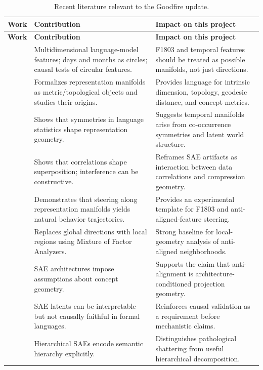 \documentclass[11pt,a4paper]{article}
\begin{document}
\begin{longtable}{@{}p{3.2cm}p{5.2cm}p{6.2cm}@{}}
\caption{Recent literature relevant to the Goodfire update.}\\
\toprule
\textbf{Work} & \textbf{Contribution} & \textbf{Impact on this project}\\
\midrule
\endfirsthead
\toprule
\textbf{Work} & \textbf{Contribution} & \textbf{Impact on this project}\\
\midrule
\endhead
\citet{engels2024multidimensional} & Multidimensional language-model features; days and months as circles; causal tests of circular features. & F1803 and temporal features should be treated as possible manifolds, not just directions.\\
\citet{modell2025origins} & Formalizes representation manifolds as metric/topological objects and studies their origins. & Provides language for intrinsic dimension, topology, geodesic distance, and concept metrics.\\
\citet{karkada2026symmetry} & Shows that symmetries in language statistics shape representation geometry. & Suggests temporal manifolds arise from co-occurrence symmetries and latent world structure.\\
\citet{prieto2026correlations} & Shows that correlations shape superposition; interference can be constructive. & Reframes SAE artifacts as interaction between data correlations and compression geometry.\\
\citet{wurgaft2026manifoldsteering} & Demonstrates that steering along representation manifolds yields natural behavior trajectories. & Provides an experimental template for F1803 and anti-aligned-feature steering.\\
\citet{shafran2026regions} & Replaces global directions with local regions using Mixture of Factor Analyzers. & Strong baseline for local-geometry analysis of anti-aligned neighborhoods.\\
\citet{hindupur2025projecting} & SAE architectures impose assumptions about concept geometry. & Supports the claim that anti-alignment is architecture-conditioned projection geometry.\\
\citet{menon2024formal} & SAE latents can be interpretable but not causally faithful in formal languages. & Reinforces causal validation as a requirement before mechanistic claims.\\
\citet{muchane2025hierarchical} & Hierarchical SAEs encode semantic hierarchy explicitly. & Distinguishes pathological shattering from useful hierarchical decomposition.\\

\end{longtable}
\end{document}
